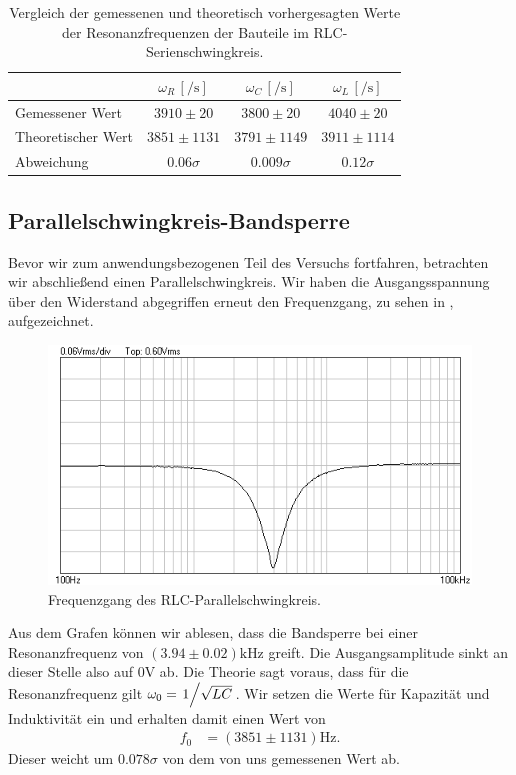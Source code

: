 \renewcommand{\arraystretch}{1.5}
\begin{table}[H]
  \centering
  \caption{Vergleich der gemessenen und theoretisch vorhergesagten Werte der Resonanzfrequenzen der Bauteile im RLC-Serienschwingkreis.}\vspace*{0.5em}
  \label{tab:omega_vergleich}
  \begin{tabular}{|l|c|c|c|}
    \hline
    & $\omega_R\,[\si{\per\second}]$ & $\omega_C\,[\si{\per\second}]$ & $\omega_L\,[\si{\per\second}]$\\\hline
    Gemessener Wert & $3910 \pm 20$ & $3800 \pm 20$ & $4040 \pm 20$ \\\hline
    Theoretischer Wert & $3851 \pm 1131$ & $3791 \pm 1149$ & $3911 \pm 1114$\\\hline\hline
    Abweichung & $0.06\sigma$ & $0.009\sigma$ & $0.12\sigma$\\
    \hline
  \end{tabular}
\end{table}
\renewcommand{\arraystretch}{1}
\newpage
\subsection{Parallelschwingkreis-Bandsperre}

Bevor wir zum anwendungsbezogenen Teil des Versuchs fortfahren, betrachten wir abschließend einen Parallelschwingkreis. Wir haben die Ausgangsspannung über den Widerstand abgegriffen erneut den Frequenzgang, zu sehen in , aufgezeichnet.


\begin{figure}[H]
  \centering
  \includegraphics[width=.8\textwidth]{files/aufgabe7_parallel_bandsperre.png}
  \caption{Frequenzgang des RLC-Parallelschwingkreis.}
  \label{fig:aufgabe7_parallel_bandsperre}
\end{figure}

Aus dem Grafen können wir ablesen, dass die Bandsperre bei einer Resonanzfrequenz von $(3.94 \pm 0.02)\si{\kilo\hertz}$ greift. Die Ausgangsamplitude sinkt an dieser Stelle also auf $0\si{\volt}$ ab. Die Theorie sagt voraus, dass für die Resonanzfrequenz gilt $\omega_0 = \flatfrac{1}{\sqrt{LC}}$. Wir setzen die Werte für Kapazität und Induktivität ein und erhalten damit einen Wert von
\begin{align}
  f_0 &= (3851 \pm 1131) \si{\hertz}.
\end{align}
Dieser weicht um $0.078\sigma$ von dem von uns gemessenen Wert ab.
\newpage
